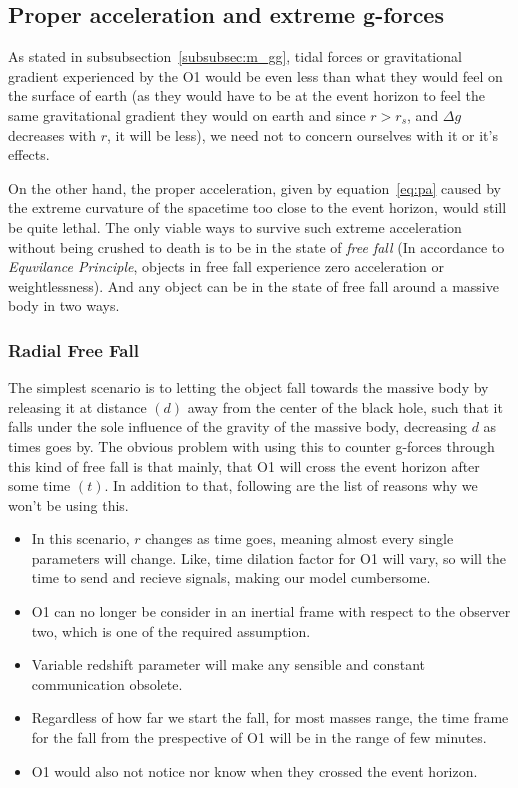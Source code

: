 \subsection{Proper acceleration and extreme g-forces}\label{subsec:pa}

As stated in subsubsection~\ref{subsubsec:m_gg}, tidal forces or gravitational gradient experienced by the O1 would be even less than what they would feel 
on the surface of earth (as they would have to be at the event horizon to feel the same gravitational gradient they would on earth and since \(r>r_s\), and \(\Delta g\) decreases with 
\(r\), it will be less), we need not to concern ourselves with it or it's effects.

On the other hand, the proper acceleration, given by equation~\ref{eq:pa} caused by the extreme curvature of the spacetime too close to the event horizon, would still be quite lethal. 
The only viable ways  to survive such extreme acceleration without being crushed to death is to be in the state of \emph{free fall} (In accordance to \emph{Equvilance Principle}, objects in free fall
experience zero acceleration or weightlessness). And any object can be in the state of free fall around a massive body in two ways. 

\subsubsection{Radial Free Fall}\label{subsubsec:rad_ff}

The simplest scenario is to letting the object fall towards the massive body by releasing it at distance \((d)\) away from the center of the black hole, such that 
it falls under the sole influence of the gravity of the massive body, decreasing \(d\) as times goes by. The obvious problem with using this to counter g-forces
through this kind of free fall is that mainly, that O1 will cross the event horizon after some time \((t)\). In addition to that, following are the list of reasons 
why we won't be using this. 

\begin{itemize}
    \item In this scenario, \(r\) changes as time goes, meaning almost every single parameters will change. Like, time dilation factor for O1 will vary, so will the time to send and recieve signals, making our model cumbersome.
    \item O1 can no longer be consider in an inertial frame with respect to the observer two, which is one of the required assumption.
    \item Variable redshift parameter will make any sensible and constant communication obsolete. 
    \item Regardless of how far we start the fall, for most masses range, the time frame for the fall from the prespective of O1 will be in the range of few minutes. 
    \item O1 would also not notice nor know when they crossed the event horizon. 
\end{itemize}

